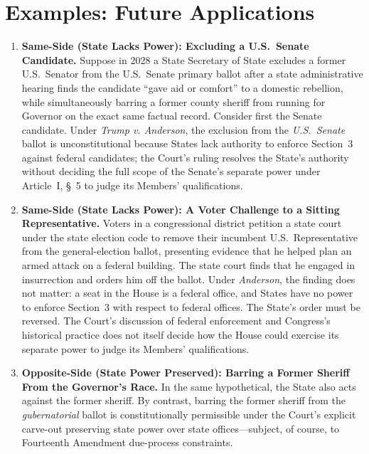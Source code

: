 \documentclass[12pt]{article}
\begin{document}
\section{Examples: Future Applications}
\begin{enumerate}

\item \textbf{Same-Side (State Lacks Power): Excluding a U.S.\ Senate Candidate.} Suppose in 2028 a State Secretary of State excludes a former U.S.\ Senator from the U.S.\ Senate primary ballot after a state administrative hearing finds the candidate ``gave aid or comfort'' to a domestic rebellion, while simultaneously barring a former county sheriff from running for Governor on the exact same factual record. Consider first the Senate candidate. Under \emph{Trump v. Anderson}, the exclusion from the \emph{U.S.\ Senate} ballot is unconstitutional because States lack authority to enforce Section~3 against federal candidates; the Court's ruling resolves the State's authority without deciding the full scope of the Senate's separate power under Article~I, \S~5 to judge its Members' qualifications.

\item \textbf{Same-Side (State Lacks Power): A Voter Challenge to a Sitting Representative.} Voters in a congressional district petition a state court under the state election code to remove their incumbent U.S.\ Representative from the general-election ballot, presenting evidence that he helped plan an armed attack on a federal building. The state court finds that he engaged in insurrection and orders him off the ballot. Under \textit{Anderson}, the finding does not matter: a seat in the House is a federal office, and States have no power to enforce Section~3 with respect to federal offices. The State's order must be reversed. The Court's discussion of federal enforcement and Congress's historical practice does not itself decide how the House could exercise its separate power to judge its Members' qualifications.

\item \textbf{Opposite-Side (State Power Preserved): Barring a Former Sheriff From the Governor's Race.} In the same hypothetical, the State also acts against the former sheriff. By contrast, barring the former sheriff from the \emph{gubernatorial} ballot is constitutionally permissible under the Court's explicit carve-out preserving state power over state offices---subject, of course, to Fourteenth Amendment due-process constraints.


\end{enumerate}
\end{document}
